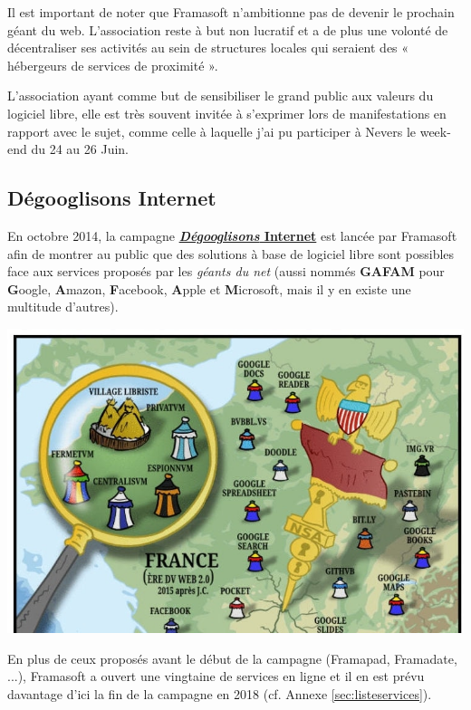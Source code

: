 \documentclass[10pt,a4paper, twoside]{report}
\begin{document}
	Il est important de noter que Framasoft n'ambitionne pas de devenir le prochain géant du web. L'association reste à but non lucratif et a de plus une volonté de décentraliser ses activités au sein de structures locales qui seraient des « hébergeurs de services de proximité ».
		
	L'association ayant comme but de sensibiliser le grand public aux valeurs du logiciel libre, elle est très souvent invitée à s'exprimer lors de manifestations en rapport avec le sujet, comme celle à laquelle j'ai pu participer à Nevers le week-end du 24 au 26 Juin.
	
	\subsection{Dégooglisons Internet}
	
	En octobre 2014, la campagne \href{https://degooglisons-internet.org/}{\textbf{\textit{Dégooglisons} Internet}} est lancée par Framasoft afin de montrer au public que des solutions à base de logiciel libre sont possibles face aux services proposés par les \textit{géants du net} (aussi nommés \textbf{GAFAM} pour \textbf{G}oogle, \textbf{A}mazon, \textbf{F}acebook, \textbf{A}pple et \textbf{M}icrosoft, mais il y en existe une multitude d'autres).
	

	\centerline{\includegraphics[width=1\textwidth]{images/degooglisons-internet.jpg}}

	
	En plus de ceux proposés avant le début de la campagne (Framapad, Framadate, ...), Framasoft a ouvert une vingtaine de services en ligne et il en est prévu davantage d'ici la fin de la campagne en 2018 (cf. Annexe \ref{sec:listeservices}).
	
\end{document}
